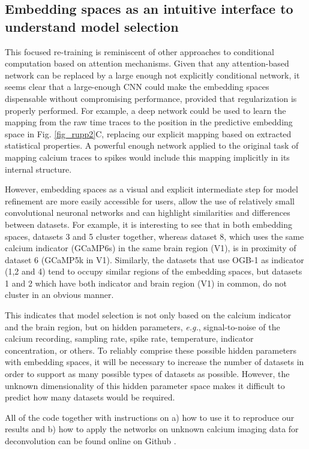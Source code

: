 \documentclass[10pt,letterpaper]{article}
\begin{document}
\subsection*{Embedding spaces as an intuitive interface to understand model selection}

This focused re-training is reminiscent of other approaches to conditional computation based on attention mechanisms. Given that any attention-based network can be replaced by a large enough not explicitly conditional network,\cite{bengio2013estimating} it seems clear that a large-enough CNN could make the embedding spaces dispensable without compromising performance, provided that regularization is properly performed. For example, a deep network could be used to learn the mapping from the raw time traces to the position in the predictive embedding space in Fig. \ref{fig_rupp2}C, replacing our explicit mapping based on extracted statistical properties. A powerful enough network applied to the original task of mapping calcium traces to spikes would include this mapping implicitly in its internal structure.

However, embedding spaces as a visual and explicit intermediate step for model refinement are more easily accessible for users, allow the use of relatively small convolutional neuronal networks and can highlight similarities and differences between datasets. For example, it is interesting to see that in both embedding spaces, datasets 3 and 5 cluster together, whereas dataset 8, which uses the same calcium indicator (GCaMP6s) in the same brain region (V1), is in proximity of dataset 6 (GCaMP5k in V1). Similarly, the datasets that use OGB-1 as indicator (1,2 and 4) tend to occupy similar regions of the embedding spaces, but datasets 1 and 2 which have both indicator and brain region (V1) in common, do not cluster in an obvious manner.

This indicates that model selection is not only based on the calcium indicator and the brain region, but on hidden parameters, \textit{e.g.}, signal-to-noise of the calcium recording, sampling rate, spike rate, temperature, indicator concentration, or others. To reliably comprise these possible hidden parameters with embedding spaces, it will be necessary to increase the number of datasets in order to support as many possible types of datasets as possible. However, the unknown dimensionality of this hidden parameter space makes it difficult to predict how many datasets would be required.

All of the code together with instructions on a) how to use it to reproduce our results and b) how to apply the networks on unknown calcium imaging data for deconvolution can be found online on Github \cite{ruppprecht2017embeddingspace}. 


\footnotesize{
\RaggedRight	


}
\end{document}
